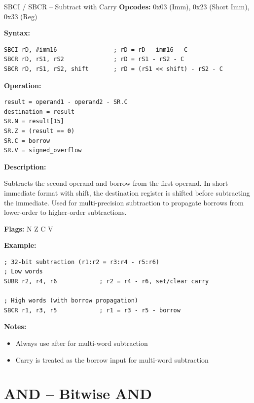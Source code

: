 \begin{instructionbox}{SBCI / SBCR -- Subtract with Carry}
	\textbf{Opcodes:} 0x03 (Imm), 0x23 (Short Imm), 0x33 (Reg)

	\textbf{Syntax:}
	\begin{lstlisting}
SBCI rD, #imm16                ; rD = rD - imm16 - C
SBCR rD, rS1, rS2              ; rD = rS1 - rS2 - C
SBCR rD, rS1, rS2, shift       ; rD = (rS1 << shift) - rS2 - C
\end{lstlisting}

	\textbf{Operation:}
	\begin{verbatim}
result = operand1 - operand2 - SR.C
destination = result
SR.N = result[15]
SR.Z = (result == 0)
SR.C = borrow
SR.V = signed_overflow
\end{verbatim}

	\textbf{Description:}

	Subtracts the second operand and borrow from the first operand. In short immediate format with
	shift, the destination register is shifted before subtracting the immediate. Used for multi-precision subtraction to
	propagate borrows from lower-order to higher-order subtractions.

	\textbf{Flags:} N Z C V

	\textbf{Example:}
	\begin{lstlisting}
; 32-bit subtraction (r1:r2 = r3:r4 - r5:r6)
; Low words
SUBR r2, r4, r6            ; r2 = r4 - r6, set/clear carry

; High words (with borrow propagation)
SBCR r1, r3, r5            ; r1 = r3 - r5 - borrow
\end{lstlisting}

	\textbf{Notes:}
	\begin{itemize}
		\item Always use after  for multi-word subtraction
		\item Carry is treated as the borrow input for multi-word subtraction
	\end{itemize}
\end{instructionbox}

\section{AND -- Bitwise AND}

